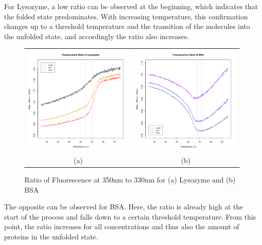\documentclass[a4paper,11pt]{article}
\begin{document}
            For Lysozyme, a low ratio can be observed at the beginning, which indicates that 
            the folded state predominates. With increasing temperature, this confirmation changes 
            up to a threshold temperature and the transition of the molecules into the unfolded state, 
            and accordingly the ratio also increases.
            \begin{figure}[H]
                \centering
                \begin{tabular}{cc}
                    \includegraphics[width=200px]{../resources/unfolding_lys_ratio.png} &
                    \includegraphics[width=200px]{../resources/unfolding_BSA_ratio.png} \\
                    (a) & (b)\\
                \end{tabular}
                \caption{Ratio of Fluorescence at 350nm to 330nm for (a) Lysozyme and (b) BSA}
                \label{fig:temp_ratio}
            \end{figure}
            
            The opposite can be observed for BSA. Here, the ratio is already high at the start of 
            the process and falls down to a certain threshold temperature. From this point, the ratio 
            increases for all concentrations and thus also the amount of proteins in the unfolded state.
            
\end{document}
